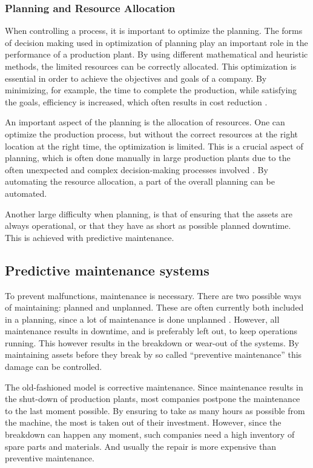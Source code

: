 \subsubsection{Planning and Resource Allocation}
When controlling a process, it is important to optimize the planning. The forms of decision making used in optimization of planning play an important role in the performance of a production plant. By using different mathematical and heuristic methods, the limited resources can be correctly allocated. This optimization is essential in order to achieve the objectives and goals of a company. By minimizing, for example, the time to complete the production, while satisfying the goals, efficiency is increased, which often results in cost reduction \citep{pinedo2005planning}.

An important aspect of the planning is the allocation of resources. One can optimize the production process, but without the correct resources at the right location at the right time, the optimization is limited. This is a crucial aspect of planning, which is often done manually in large production plants due to the often unexpected and complex decision-making processes involved \citep{pinedo2005planning}. By automating the resource allocation, a part of the overall planning can be automated.

Another large difficulty when planning, is that of ensuring that the assets are always operational, or that they have as short as possible planned downtime. This is achieved with predictive maintenance.

\subsection{Predictive maintenance systems}
To prevent malfunctions, maintenance is necessary. There are two possible ways of maintaining: planned and unplanned. These are often currently both included in a planning, since a lot of maintenance is done unplanned \citep{dey2004decision}. However, all maintenance results in downtime, and is preferably left out, to keep operations running. This however results in the breakdown or wear-out of the systems. By maintaining assets before they break by so called ``preventive maintenance'' this damage can be controlled.

The old-fashioned model is corrective maintenance. Since maintenance results in the shut-down of production plants, most companies postpone the maintenance to the last moment possible. By ensuring to take as many hours as possible from the machine, the most is taken out of their investment. However, since the breakdown can happen any moment, such companies need a high inventory of spare parts and materials.  And usually the repair is more expensive than preventive maintenance.

